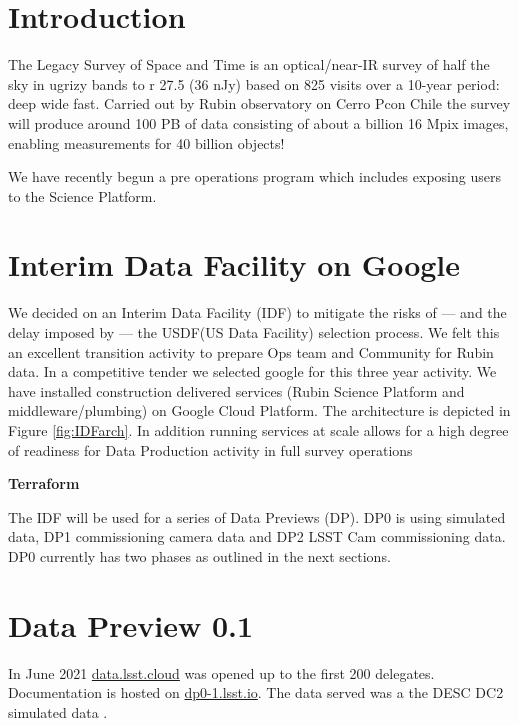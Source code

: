 \section{Introduction}

The Legacy Survey of Space and Time is an optical/near-IR survey of half the sky in ugrizy bands to r 27.5 (36 nJy) based on 825 visits over a 10-year period: deep wide fast.
Carried out by Rubin observatory on Cerro Pcon Chile the survey will produce around 100 PB of data consisting of about a billion 16 Mpix images, enabling measurements for 40 billion objects! \cite{arXiv:0805.2366}

We have recently begun a pre operations program which includes exposing users to the Science Platform.


\section{Interim Data Facility on Google }
We decided on an Interim Data Facility (IDF) to mitigate the risks of — and the delay imposed by — the USDF(US Data Facility)  selection process.
We felt this an excellent transition activity to prepare Ops team and Community for Rubin data.
In a competitive tender we selected google for this three year activity.
We have installed construction delivered services (Rubin Science Platform and middleware/plumbing) on Google Cloud Platform. The architecture is depicted in Figure \ref{fig:IDFarch}.
In addition running services at scale allows for a high degree of readiness for Data Production activity in full survey operations

{\bf Terraform}





The IDF will be used for a series of Data Previews (DP). DP0 is using simulated data, DP1 commissioning camera data
and DP2 LSST Cam commissioning data. DP0 currently has two phases as outlined in the next sections.


\section{Data Preview 0.1}
In June 2021  \href{  data.lsst.cloud}{data.lsst.cloud} was opened up to the first 200 delegates.
Documentation is hosted on \href{ dp0-1.lsst.io}{ dp0-1.lsst.io}.
The data served was a the DESC DC2 simulated data \citep{arXiv:2010.05926}.



